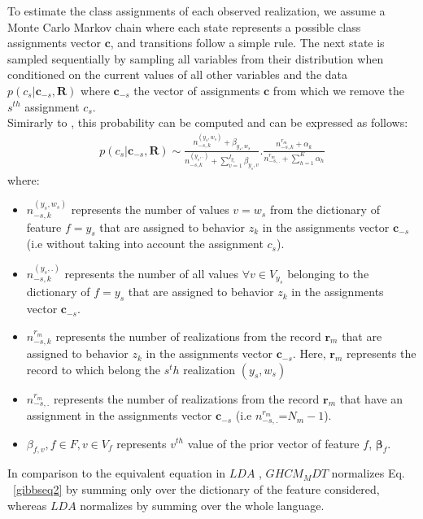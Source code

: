 To estimate the class assignments of each observed realization, we assume a Monte Carlo Markov chain \cite{montecarlo} where each state represents a possible class assignments vector $\mathbf{c}$, and transitions follow a simple rule. The next state is sampled sequentially by sampling all variables from their distribution when conditioned on the current values of all other variables and the data $p(c_{s}|\mathbf{c}_{-s},\mathbf{R})$ where $\mathbf{c}_{-s}$ the vector of assignments $\mathbf{c}$ from which we remove the $s^{th}$ assignment $c_{s}$.
\\Simirarly to \cite{gibbs}, this probability can be computed and can be expressed as follows:
\begin{equation}\label{gibbseq2}
\begin{split} 
p(c_{s}|\mathbf{c}_{-s},\mathbf{R})\sim \frac{n^{(y_{s},w_{s})}_{-s,k}+\beta _{y_{s},w_{s}}}{n^{(y_{s},.)}_{-s,k}+\sum_{v=1}^{I_{y_{s}}}\beta _{y_{s},v}}.\frac{n^{r_{m}}_{-s,k}+\alpha _{k}}{n^{r_{m}}_{-s,.}+\sum_{h=1}^{K}\alpha _{h}}
\end{split} 
\end{equation}
where:
\begin{itemize} 
	\item $n^{(y_{s},w_{s})}_{-s,k}$ represents the number of values $v=w_{s}$ from the dictionary of feature $f=y_{s}$ that are assigned to behavior $z_{k}$ in the assignments vector $\mathbf{c}_{-s}$ (i.e without taking into 			account the assignment $c_{s}$).
	\item $n^{(y_{s},.)}_{-s,k}$ represents the number of all values $\forall v \in V_{y_{s}}$ belonging to the dictionary of $f=y_{s}$ that are assigned to behavior $z_{k}$ in the assignments vector $\mathbf{c}_{-s}$.
	\item  $n^{r_{m}}_{-s,k}$ represents the number of realizations from the record $\mathbf{r}_{m}$ that are assigned to behavior $z_{k}$ in the assignments vector $\mathbf{c}_{-s}$. Here, $\mathbf{r}_{m}$ represents the 		record to which belong the $s^th$ realization $(y_{s},w_{s})$
	\item  $n^{r_{m}}_{-s,.}$ represents the number of realizations from the record $\mathbf{r}_{m}$ that have an assignment in the assignments vector $\mathbf{c}_{-s}$ (i.e $n^{r_{m}}_{-s,.}$=$N_{m}-1$).
	\item  $\beta _{f,v}, f\in F, v \in V_{f}$ represents $v^{th}$ value of the prior vector of feature $f$, $\boldsymbol{\beta }_{f}$.
\end{itemize}
In comparison to the equivalent equation in $LDA$ \cite{gibbs}, $GHCM_MDT$ normalizes Eq. ~\eqref{gibbseq2} by summing only over the dictionary of the feature considered, whereas $LDA$ normalizes by summing over the whole language.
